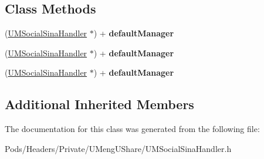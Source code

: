 \subsection*{Class Methods}
\begin{DoxyCompactItemize}
\item 
\mbox{\label{interface_u_m_social_sina_handler_a755c67f05900272136ee2201cf6b1d66}} 
(\mbox{\hyperlink{interface_u_m_social_sina_handler}{U\+M\+Social\+Sina\+Handler}} $\ast$) + {\bfseries default\+Manager}
\item 
\mbox{\label{interface_u_m_social_sina_handler_a755c67f05900272136ee2201cf6b1d66}} 
(\mbox{\hyperlink{interface_u_m_social_sina_handler}{U\+M\+Social\+Sina\+Handler}} $\ast$) + {\bfseries default\+Manager}
\item 
\mbox{\label{interface_u_m_social_sina_handler_a755c67f05900272136ee2201cf6b1d66}} 
(\mbox{\hyperlink{interface_u_m_social_sina_handler}{U\+M\+Social\+Sina\+Handler}} $\ast$) + {\bfseries default\+Manager}
\end{DoxyCompactItemize}
\subsection*{Additional Inherited Members}


The documentation for this class was generated from the following file\+:\begin{DoxyCompactItemize}
\item 
Pods/\+Headers/\+Private/\+U\+Meng\+U\+Share/U\+M\+Social\+Sina\+Handler.\+h\end{DoxyCompactItemize}
